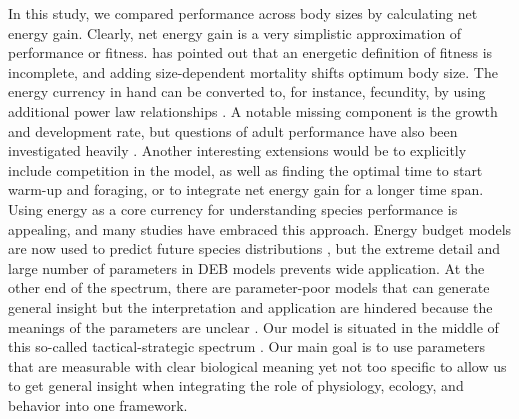 %
%

In  this study, we compared performance across body sizes by calculating net energy gain.
Clearly, net energy gain is a very simplistic approximation of performance or fitness.
\citet{Kozlowski1996} has pointed out that an energetic definition of fitness is incomplete, and adding size-dependent mortality shifts optimum body size.
The energy currency in hand can be converted to, for instance, fecundity, by using additional power law relationships \citep{Kooijman2009}. %
A notable missing component is the growth and development rate, but questions of adult performance have also been investigated heavily \citep{VandH1996, Kozlowski2004,Kooijman2009}. %
Another interesting extensions would be to explicitly include competition in the model, as well as finding the optimal time to start warm-up and foraging, or to integrate net energy gain for a longer time span.
Using energy as a core currency for understanding species performance is appealing, and many studies have embraced this approach.
Energy budget models are now used to predict future species distributions \citep[e.g.,][]{Buckley2008}, but the extreme detail and large number of parameters in DEB models \citep{Kooijman2009} prevents wide application.
At the other end of the spectrum, there are parameter-poor models that can generate general insight but the interpretation and application are hindered because the meanings of the parameters are unclear \citep[e.g.,][]{Brown1993}.
Our model is situated in the middle of this so-called tactical-strategic spectrum \citet{Holling1966}.
Our main goal is to use parameters that are measurable with clear biological meaning yet not too specific to allow us to get general insight when integrating the role of physiology, ecology, and behavior into one framework.


